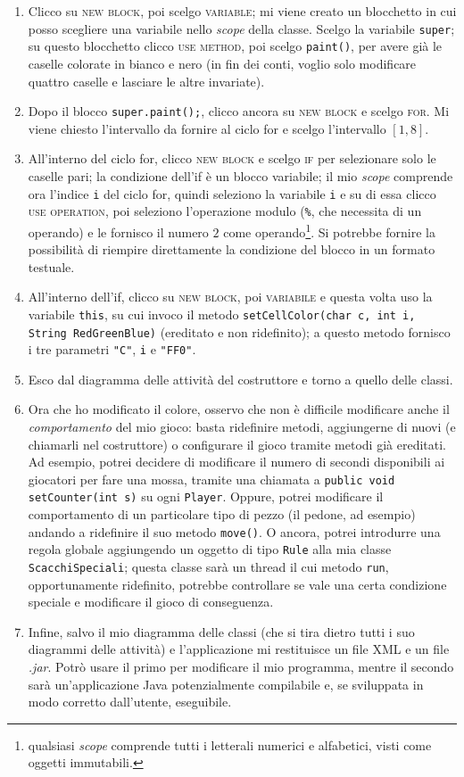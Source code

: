 \begin{enumerate}
	\item Clicco su \textsc{new block}, poi scelgo \textsc{variable}; mi viene creato un blocchetto in cui posso scegliere una variabile nello \emph{scope} della classe. Scelgo la variabile \texttt{super}; su questo blocchetto clicco \textsc{use method}, poi scelgo \texttt{paint()}, per avere già le caselle colorate in bianco e nero (in fin dei conti, voglio solo modificare quattro caselle e lasciare le altre invariate).
	\item Dopo il blocco \texttt{super.paint();}, clicco ancora su \textsc{new block} e scelgo \textsc{for}. Mi viene chiesto l'intervallo da fornire al ciclo for e scelgo l'intervallo $[1, 8]$.
	\item All'interno del ciclo for, clicco \textsc{new block} e scelgo \textsc{if} per selezionare solo le caselle pari; la condizione dell'if è un blocco variabile; il mio \emph{scope} comprende ora l'indice \texttt{i} del ciclo for, quindi seleziono la variabile \texttt{i} e su di essa clicco \textsc{use operation}, poi seleziono l'operazione modulo (\texttt{\%}, che necessita di un operando) e le fornisco il numero $2$ come operando\footnote{qualsiasi \emph{scope} comprende tutti i letterali numerici e alfabetici, visti come oggetti immutabili.}. Si potrebbe fornire la possibilità di riempire direttamente la condizione del blocco in un formato testuale. %
	\item All'interno dell'if, clicco su \textsc{new block}, poi \textsc{variabile} e questa volta uso la variabile \texttt{this}, su cui invoco il metodo \texttt{setCellColor(char c, int i, String RedGreenBlue)} (ereditato e non ridefinito); a questo metodo fornisco i tre parametri \texttt{"C"}, \texttt{i} e \texttt{"FF0"}.
	\item Esco dal diagramma delle attività del costruttore e torno a quello delle classi.
	\item Ora che ho modificato il colore, osservo che non è difficile modificare anche il \emph{comportamento} del mio gioco: basta ridefinire metodi, aggiungerne di nuovi (e chiamarli nel costruttore) o configurare il gioco tramite metodi già ereditati. Ad esempio, potrei decidere di modificare il numero di secondi disponibili ai giocatori per fare una mossa, tramite una chiamata a \texttt{public void setCounter(int s)} su ogni \texttt{Player}. Oppure, potrei modificare il comportamento di un particolare tipo di pezzo (il pedone, ad esempio) andando a ridefinire il suo metodo \texttt{move()}. O ancora, potrei introdurre una regola globale aggiungendo un oggetto di tipo \texttt{Rule} alla mia classe \texttt{ScacchiSpeciali}; questa classe sarà un thread il cui metodo \texttt{run}, opportunamente ridefinito, potrebbe controllare se vale una certa condizione speciale e modificare il gioco di conseguenza.
	\item Infine, salvo il mio diagramma delle classi (che si tira dietro tutti i suo diagrammi delle attività) e l'applicazione mi restituisce un file XML e un file \emph{.jar}. Potrò usare il primo per modificare il mio programma, mentre il secondo sarà un'applicazione Java potenzialmente compilabile e, se sviluppata in modo corretto dall'utente, eseguibile.
\end{enumerate}



